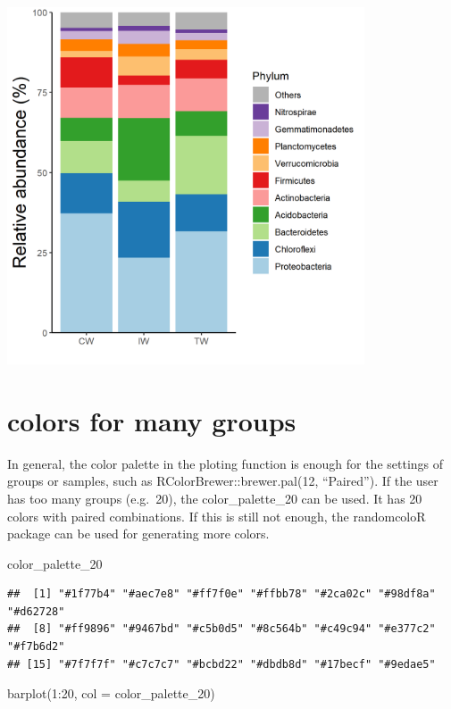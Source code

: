 \documentclass[
]{book}
\newenvironment{Shaded}{\begin{snugshade}}{\end{snugshade}}
\newcommand{\AttributeTok}[1]{\textcolor[rgb]{0.77,0.63,0.00}{#1}}
\newcommand{\DecValTok}[1]{\textcolor[rgb]{0.00,0.00,0.81}{#1}}
\newcommand{\FunctionTok}[1]{\textcolor[rgb]{0.00,0.00,0.00}{#1}}
\newcommand{\NormalTok}[1]{#1}
\newcommand{\SpecialCharTok}[1]{\textcolor[rgb]{0.00,0.00,0.00}{#1}}
\begin{document}
\begin{center}\includegraphics[width=400px]{Images/plot_bar_mean_classic} \end{center}

\hypertarget{colors-for-many-groups}{%
\section{colors for many groups}\label{colors-for-many-groups}}

In general, the color palette in the ploting function is enough for the settings of groups or samples,
such as RColorBrewer::brewer.pal(12, ``Paired'').
If the user has too many groups (e.g.~20), the color\_palette\_20 can be used. It has 20 colors with paired combinations.
If this is still not enough, the randomcoloR package can be used for generating more colors.

\begin{Shaded}
\begin{Highlighting}[]
\NormalTok{color\_palette\_20}
\end{Highlighting}
\end{Shaded}

\begin{verbatim}
##  [1] "#1f77b4" "#aec7e8" "#ff7f0e" "#ffbb78" "#2ca02c" "#98df8a" "#d62728"
##  [8] "#ff9896" "#9467bd" "#c5b0d5" "#8c564b" "#c49c94" "#e377c2" "#f7b6d2"
## [15] "#7f7f7f" "#c7c7c7" "#bcbd22" "#dbdb8d" "#17becf" "#9edae5"
\end{verbatim}

\begin{Shaded}
\begin{Highlighting}[]
\FunctionTok{barplot}\NormalTok{(}\DecValTok{1}\SpecialCharTok{:}\DecValTok{20}\NormalTok{, }\AttributeTok{col =}\NormalTok{ color\_palette\_20)}
\end{Highlighting}
\end{Shaded}
\end{document}
